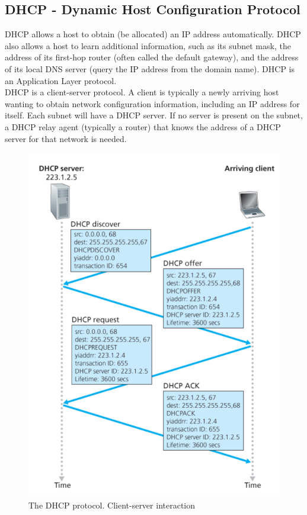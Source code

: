 \documentclass[a4paper, 11pt]{article}
\begin{document}
\subsection{DHCP - Dynamic Host Configuration Protocol}

DHCP allows a host to obtain (be allocated) an IP address automatically. DHCP also allows a host to learn additional information, such as its subnet mask, the address of its first-hop router (often called the default gateway), and the address of its local DNS server (query the IP address from the domain name). DHCP is an Application Layer protocol.\\

DHCP is a client-server protocol. A client is typically a newly arriving host wanting to obtain network configuration information, including an IP address for itself.  Each subnet  will have a DHCP server. If no server is present on the subnet, a DHCP relay agent (typically a router) that knows the address of a DHCP server for that network is needed.\\

\begin{figure}[h]
\includegraphics[scale=0.6]{dhcp-protocol.png}
\caption{The DHCP protocol. Client-server interaction}
\end{figure}
\end{document}

